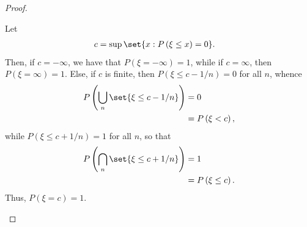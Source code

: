 \documentclass[10pt]{mypackage}
\begin{document}
\begin{proof}
\begin{enumerate}[(i)]
      Let
      \begin{align*}
        c &= \sup\set{x : P\left( \xi \leq x \right) = 0}.
      \end{align*}
      Then, if $c = -\infty$, we have that $P\left( \xi = -\infty \right) = 1$, while if $c = \infty$, then $P\left( \xi = \infty \right) = 1$. Else, if $c$ is finite, then $P\left( \xi\leq c-1/n \right) = 0$ for all $n$, whence
      \begin{align*}
        P\left( \bigcup_{n}\set{\xi\leq c-1/n} \right) &= 0\\
                                                       &= P\left( \xi < c \right),
      \end{align*}
      while $P\left( \xi\leq c + 1/n \right) = 1$ for all $n$, so that
      \begin{align*}
        P\left( \bigcap_{n}\set{\xi\leq c + 1/n} \right) &= 1\\
                                                         &= P\left( \xi\leq c \right).
      \end{align*}
      Thus, $P\left( \xi = c \right) = 1$.
  \end{enumerate}
\end{proof}
\end{document}
